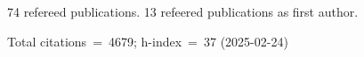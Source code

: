 74 refereed publications. 13 refeered publications as first author.

Total citations~=~4679; h-index~=~37 (2025-02-24)